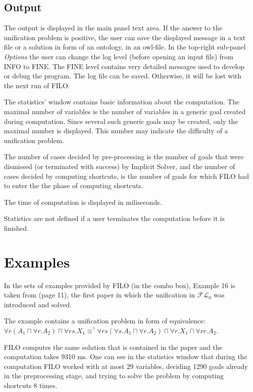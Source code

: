 \documentclass{article}
\newcommand{\flo}{\ensuremath{\mathcal{FL}_0}\xspace}
\begin{document}
\subsection{Output}
The output is displayed in the main panel text area. If the answer to the unification problem is positive, the user can save the displayed message in a text file or a solution in
form of an ontology, in an owl-file. In the top-right sub-panel \emph{Options} the user can change the log level (before opening an input file) from INFO to FINE.
The FINE level contains very detailed messages used to develop or debug the program. The log file can be saved. Otherwise, it will be lost with the next run of FILO.

The statistics' window contains basic information about the computation. The maximal number of variables is the number of variables in a generic goal created during computation. Since several such generic goals may be created, only the maximal number is displayed. This number may indicate the difficulty of a unification problem.

The number of cases decided by pre-processing is the number of goals that were dismissed (or terminated with success) by Implicit Solver, and the number of cases decided by computing shortcuts,
is the number of goals for which FILO had to enter the the phase of computing shortcuts.

The time of computation is displayed in miliseconds.
	
Statistics are not defined if a user terminates the computation	before it is finished.
	
	\section{Examples}
	
	In the sets of examples provided by FILO (in the combo box), Example 16 is taken from \cite{BaNa-JSC01} (page 11), the first paper in which the unification in \flo was introduced and solved.

The example contains a unification problem in form of equivalence:
	$\forall r(A_1 \sqcap \forall r.A_2) \sqcap \forall rs.X_1 \equiv^? 
	\forall rs(\forall s.A_1 \sqcap \forall r.A_2) \sqcap \forall r.X_1 \sqcap \forall rr.A_2$.
	
	FILO computes the same solution that is contained in the paper and the computation takes 9310 ms.
One can see in the statistics window that during the computation FILO worked with at most 29 variables, deciding 1290 goals already in the preprocessing stage, and trying to solve the problem by computing shortcuts 8 times.%
	
\end{document}
